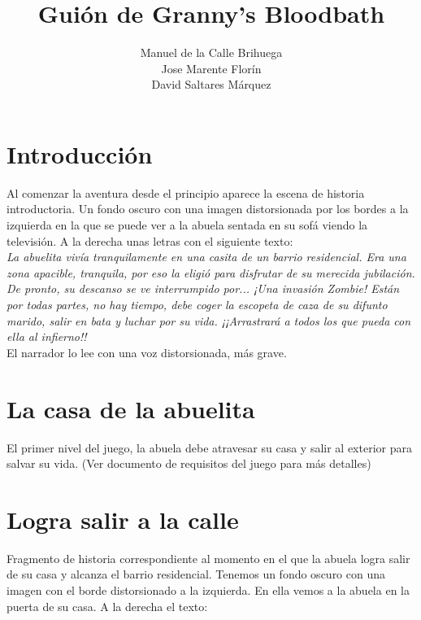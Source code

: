 \documentclass[titlepage]{article}
\author{Manuel de la Calle Brihuega\\Jose Marente Florín\\David Saltares Márquez}
\title{Guión de Granny's Bloodbath}
\begin{document}
\maketitle

\clearpage

\tableofcontents

\clearpage

\section{Introducción}

Al comenzar la aventura desde el principio aparece la escena de historia introductoria. Un fondo oscuro con una imagen distorsionada por los bordes a la izquierda en la que se puede ver a la abuela sentada en su sofá viendo la televisión. A la derecha unas letras con el siguiente texto:\\

\emph{La abuelita vivía tranquilamente en una casita de un barrio residencial. Era una zona apacible, tranquila, por eso la eligió para disfrutar de su merecida jubilación. De pronto, su descanso se ve interrumpido por... ¡Una invasión Zombie! Están por todas partes, no hay tiempo, debe coger la escopeta de caza de su difunto marido, salir en bata y luchar por su vida. ¡¡Arrastrará a todos los que pueda con ella al infierno!!}\\

El narrador lo lee con una voz distorsionada, más grave.

\section{La casa de la abuelita}

El primer nivel del juego, la abuela debe atravesar su casa y salir al exterior para salvar su vida. (Ver documento de requisitos del juego para más detalles)

\section{Logra salir a la calle}

Fragmento de historia correspondiente al momento en el que la abuela logra salir de su casa y alcanza el barrio residencial. Tenemos un fondo oscuro con una imagen con el borde distorsionado a la izquierda. En ella vemos a la abuela en la puerta de su casa. A la derecha el texto: \\
\end{document}
